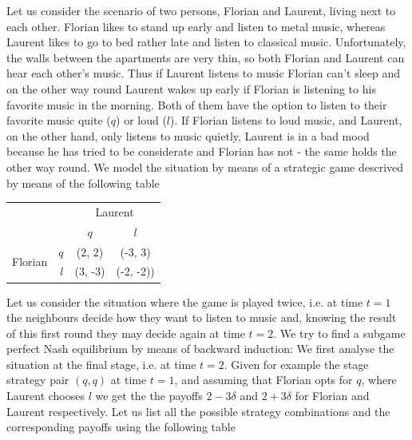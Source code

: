 \begin{example}
    Let us consider the scenario of two persons, Florian and Laurent, living next to each other. Florian likes to stand up early and listen to metal music, 
    whereas Laurent likes to go to bed rather late and listen to classical music. Unfortunately, the walls between the apartments are very thin, so both 
    Florian and Laurent can hear each other's music. Thus if Laurent listens to music Florian can't sleep and on the other way round Laurent wakes up early
    if Florian is listening to his favorite music in the morning. Both of them have the option to listen to their favorite music quite ($q$) or loud ($l$). 
    If Florian listens to loud music, and Laurent, on the other hand, only listens to music quietly, Laurent is in a bad mood because he has tried to be
    considerate and Florian has not - the same holds the other way round. We model the situation by means of a strategic game descrived by means of the 
    following table
    \begin{center}
        \begin{tabular}{c | r | c | c |}
            \multicolumn{2}{c}{} & \multicolumn{2}{c}{Laurent}\\
            \cline{2-4}
            & & $q$ & $l$ \\
            \cline{2-4}
            \multirow{2}{*}{Florian} & $q$ & (2, 2) & (-3, 3) \\
            \cline{2-4}
            & $l$ & (3, -3) & (-2, -2)) \\
            \cline{2-4}
        \end{tabular}            
    \end{center}
    Let us consider the situation where the game is played twice, i.e. at time $t = 1$ the neighbours decide how they want to listen to music and, knowing 
    the result of this first round they may decide again at time $t = 2$. We try to find a subgame perfect Nash equilibrium by means of backward induction: We 
    first analyse the situation at the final stage, i.e. at time $t = 2$. Given for example the stage strategy pair $(q, q)$ at time $t = 1$, and assuming that
    Florian opts for $q$, where Laurent chooses $l$ we get the the payoffs $2 -3 \delta$ and $2 + 3\delta$ for Florian and Laurent respectively. Let us list
    all the possible strategy combinations and the corresponding payoffs using the following table
    \begin{center}
        \begin{tabular}{| c | c | c |}

\end{tabular}
\end{center}
\end{example}
